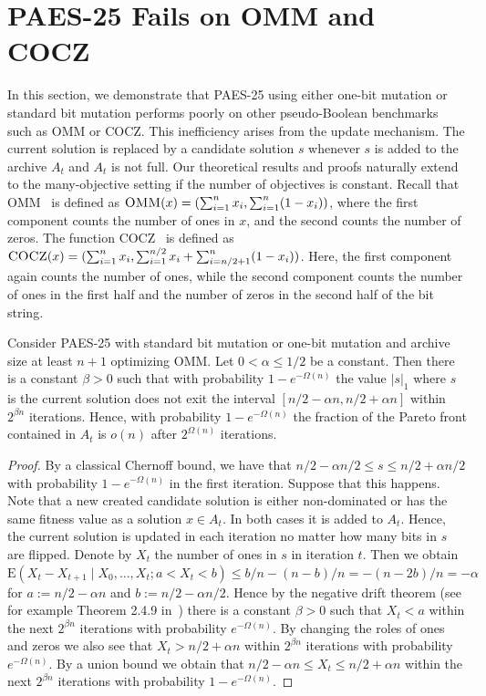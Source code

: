 \documentclass[
sigconf = false, %
review = false, %
screen = true, %
anonymous = true, %
format=acmsmall
]{acmart}
\newcommand{\ones}[1]{|#1|_1}
\newcommand{\OMM}{\textsc{OMM}\xspace}
\newcommand{\COCZ}{\textsc{COCZ}\xspace}
\newcommand*{\E}{\mathrm{E}}
\newcommand{\PAES}{PAES-25\xspace}
\begin{document}
\section{\PAES Fails on \OMM and \COCZ}

In this section, we demonstrate that \PAES using either one-bit mutation or standard bit mutation performs poorly on other pseudo-Boolean benchmarks such as \OMM or \COCZ. This inefficiency arises from the update mechanism. The current solution is replaced by a candidate solution $s$ whenever $s$ is added to the archive $A_t$ and $A_t$ is not full. Our theoretical results and proofs naturally extend to the many-objective setting if the number of objectives is constant. Recall that \OMM~\cite{Giel2010} is defined as $\OMM(x)=(\sum_{i=1}^n x_i,\sum_{i=1}^n (1-x_i))$, where the first component counts the number of ones in $x$, and the second counts the number of zeros. The function \COCZ~\cite{Laumanns2004} is defined as $\COCZ(x)=(\sum_{i=1}^n x_i,\sum_{i=1}^{n/2} x_i + \sum_{i=n/2+1}^n (1-x_i))$. Here, the first component again counts the number of ones, while the second component counts the number of ones in the first half and the number of zeros in the second half of the bit string.

\begin{theorem}
\label{thm:spreading-Pareto-front-omm}
    Consider \PAES with standard bit mutation or one-bit mutation and archive size at least $n+1$ optimizing \OMM. Let $0 < \alpha \leq 1/2$ be a constant. Then there is a constant $\beta>0$ such that with probability $1-e^{-\Omega(n)}$ the value $\ones{s}$ where $s$ is the current solution does not exit the interval $[n/2-\alpha n,n/2+\alpha n]$ within $2^{\beta n}$ iterations. Hence, with probability $1-e^{-\Omega(n)}$ the fraction of the Pareto front contained in $A_t$ is $o(n)$ after $2^{\Omega(n)}$ iterations. 
\end{theorem}

\begin{proof}
    By a classical Chernoff bound, we have that $n/2-\alpha n/2 \leq s \leq n/2+\alpha n/2$ with probability $1-e^{-\Omega(n)}$ in the first iteration. Suppose that this happens. Note that a new created candidate solution is either non-dominated or has the same fitness value as a solution $x \in A_t$. In both cases it is added to $A_t$. Hence, the current solution is updated in each iteration no matter how many bits in $s$ are flipped. Denote by $X_t$ the number of ones in $s$ in iteration $t$. Then we obtain $\E(X_t-X_{t+1} \mid X_0, \ldots , X_t; a < X_t < b) \leq b/n - (n-b)/n   = -(n-2b)/n = -\alpha$ for $a:=n/2-\alpha n$ and $b:=n/2-\alpha n/2$.
    Hence by the negative drift theorem (see for example Theorem 2.4.9 in~\cite{Lengler2020}) there is a constant $\beta>0$ such that $X_t<a$ within the next $2^{\beta n}$ iterations with probability $e^{-\Omega(n)}$. By changing the roles of ones and zeros we also see that $X_t > n/2+\alpha n$ within $2^{\beta n}$ iterations with probability $e^{-\Omega(n)}$. By a union bound we obtain that $n/2 - \alpha n \leq X_t \leq n/2+\alpha n$ within the next $2^{\beta n}$ iterations with probability $1-e^{-\Omega(n)}$.
\end{proof}
\end{document}
